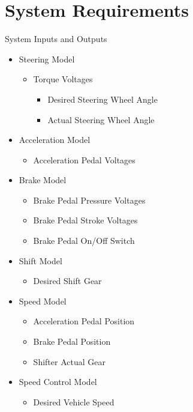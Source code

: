 \documentclass{beamer}
\begin{document}
\section{System Requirements}
\begin{frame}
\tiny
	\begin{block}{System Inputs and Outputs}
		\begin{itemize}
			\tiny
		    \item Steering Model
		    \begin{itemize}
		    \tiny
		    		\item Torque Voltages
		    		\begin{itemize}
		    		\tiny
		    			\item Desired Steering Wheel Angle
		    			\item Actual Steering Wheel Angle
		    		\end{itemize}
		    \end{itemize}
		    \item Acceleration Model
		    \begin{itemize}
		    \tiny
		    		\item Acceleration Pedal Voltages
		    \end{itemize}
		    \item Brake Model
		    \begin{itemize}
		    \tiny
		    		\item Brake Pedal Pressure Voltages
		    		\item Brake Pedal Stroke Voltages 
		    		\item Brake Pedal On/Off Switch
		    \end{itemize}
		    \item Shift Model
		    \begin{itemize}
		    \tiny
		    		\item Desired Shift Gear
		    \end{itemize}
		    \item Speed Model
		    \begin{itemize}
		    \tiny
		    		\item Acceleration Pedal Position
		    		\item Brake Pedal Position
		    		\item Shifter Actual Gear
		    \end{itemize}
		    \item Speed Control Model
		    \begin{itemize}
		    \tiny
		    		\item Desired Vehicle Speed
		    \end{itemize}
		\end{itemize}
	\end{block}
\end{frame}
\end{document}
